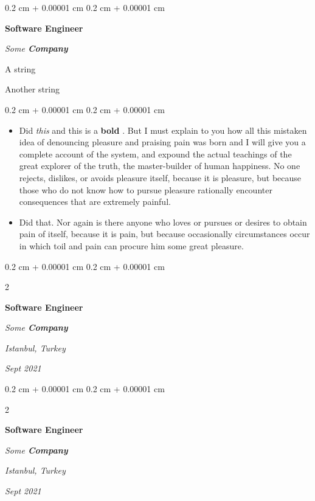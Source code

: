 \documentclass[10pt, letterpaper]{article}
\newenvironment{summary}{
    \begin{description}[
        topsep=0.10 cm,
        parsep=0.10 cm,
        partopsep=0pt,
        itemsep=0pt,
        leftmargin=0.4 cm + 10pt
    ]
}{
    \end{description}
} %
\newenvironment{highlights}{
    \begin{itemize}[
        topsep=0.10 cm,
        parsep=0.10 cm,
        partopsep=0pt,
        itemsep=0pt,
        leftmargin=0.4 cm + 10pt
    ]
}{
    \end{itemize}
} %
\newenvironment{onecolentry}{
    \begin{adjustwidth}{
        0.2 cm + 0.00001 cm
    }{
        0.2 cm + 0.00001 cm
    }
}{
    \end{adjustwidth}
} %
\newenvironment{twocolentry}[2][]{
    \onecolentry
    \def\secondColumn{#2}
    \setcolumnwidth{\fill, 4.5 cm}
    \begin{paracol}{2}
}{
    \switchcolumn \raggedleft \secondColumn
    \end{paracol}
    \endonecolentry
} %
\let\hrefWithoutArrow\href
\renewcommand{\href}[2]{\hrefWithoutArrow{#1}{\ifthenelse{\equal{#2}{}}{ }{#2 }\raisebox{.15ex}{\footnotesize \faExternalLink*}}}
\begin{document}
        \begin{onecolentry}
            \textbf{Software Engineer}
            
            \textit{Some \textbf{Company}}
        \end{onecolentry}
            \begin{summary}
                \item A string
                \item Another string
            \end{summary}
        \vspace{0.10 cm}
        \begin{onecolentry}
            \begin{highlights}
                \item Did \textit{this} and this is a \textbf{bold} \href{https://example.com}{link}. But I must explain to you how all this mistaken idea of denouncing pleasure and praising pain was born and I will give you a complete account of the system, and expound the actual teachings of the great explorer of the truth, the master-builder of human happiness. No one rejects, dislikes, or avoids pleasure itself, because it is pleasure, but because those who do not know how to pursue pleasure rationally encounter consequences that are extremely painful.
                \item Did that. Nor again is there anyone who loves or pursues or desires to obtain pain of itself, because it is pain, but because occasionally circumstances occur in which toil and pain can procure him some great pleasure.
            \end{highlights}
        \end{onecolentry}


        \vspace{0.2 cm}

        \begin{twocolentry}{
        \textit{Istanbul, Turkey}    
            
        \textit{Sept 2021}}
            \textbf{Software Engineer}
            
            \textit{Some \textbf{Company}}
        \end{twocolentry}


        \vspace{0.2 cm}

        \begin{twocolentry}{
        \textit{Istanbul, Turkey}    
            
        \textit{Sept 2021}}
            \textbf{Software Engineer}
            
            \textit{Some \textbf{Company}}
        \end{twocolentry}
\end{document}
